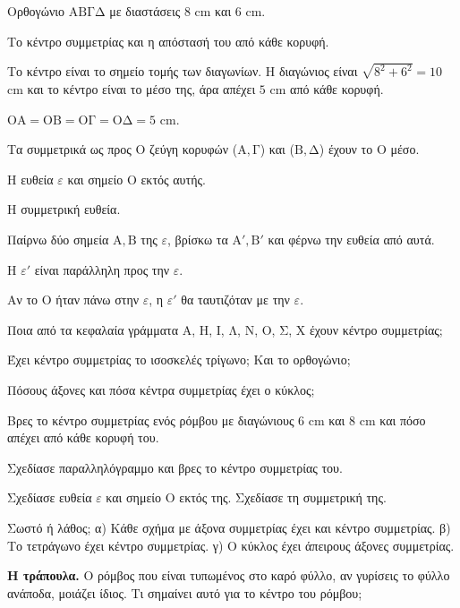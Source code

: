 \tixero Ορθογώνιο $\mathrm{ΑΒΓΔ}$ με διαστάσεις $8$ cm και $6$ cm.\par
\tithelo Το κέντρο συμμετρίας και η απόστασή του από κάθε κορυφή.\par
\possindeo Το κέντρο είναι το σημείο τομής των διαγωνίων. Η διαγώνιος είναι $\sqrt{8^2+6^2}=10$ cm και το κέντρο είναι το μέσο της, άρα απέχει $5$ cm από κάθε κορυφή.\par
\apantisi $\mathrm{ΟΑ}=\mathrm{ΟΒ}=\mathrm{ΟΓ}=\mathrm{ΟΔ}=5$ cm.\par
\elegxos Τα συμμετρικά ως προς $\mathrm{Ο}$ ζεύγη κορυφών ($\mathrm{Α},\mathrm{Γ}$) και ($\mathrm{Β},\mathrm{Δ}$) έχουν το $\mathrm{Ο}$ μέσο.

\tixero Η ευθεία $\varepsilon$ και σημείο $\mathrm{Ο}$ εκτός αυτής.\par
\tithelo Η συμμετρική ευθεία.\par
\possindeo Παίρνω δύο σημεία $\mathrm{Α},\mathrm{Β}$ της $\varepsilon$, βρίσκω τα $\mathrm{Α}',\mathrm{Β}'$ και φέρνω την ευθεία από αυτά.\par
\apantisi Η $\varepsilon'$ είναι παράλληλη προς την $\varepsilon$.\par
\elegxos Αν το $\mathrm{Ο}$ ήταν πάνω στην $\varepsilon$, η $\varepsilon'$ θα ταυτιζόταν με την $\varepsilon$.



\ex Ποια από τα κεφαλαία γράμματα Α, Η, Ι, Λ, Ν, Ο, Σ, Χ έχουν κέντρο συμμετρίας;

\ex Έχει κέντρο συμμετρίας το ισοσκελές τρίγωνο; Και το ορθογώνιο;

\ex Πόσους άξονες και πόσα κέντρα συμμετρίας έχει ο κύκλος;

\ex Βρες το κέντρο συμμετρίας ενός ρόμβου με διαγώνιους $6$ cm και $8$ cm και πόσο απέχει από κάθε κορυφή του.

\ex Σχεδίασε παραλληλόγραμμο και βρες το κέντρο συμμετρίας του.

\ex Σχεδίασε ευθεία $\varepsilon$ και σημείο $\mathrm{Ο}$ εκτός της. Σχεδίασε τη συμμετρική της.

\ex Σωστό ή λάθος; α) Κάθε σχήμα με άξονα συμμετρίας έχει και κέντρο συμμετρίας. \quad β) Το τετράγωνο έχει κέντρο συμμετρίας. \quad γ) Ο κύκλος έχει άπειρους άξονες συμμετρίας.


\ex \textbf{Η τράπουλα.} Ο ρόμβος που είναι τυπωμένος στο καρό φύλλο, αν γυρίσεις το φύλλο ανάποδα, μοιάζει ίδιος. Τι σημαίνει αυτό για το κέντρο του ρόμβου;

